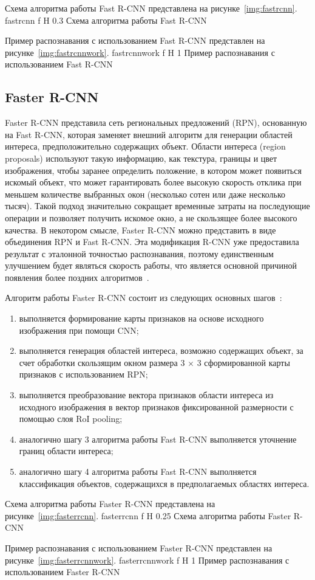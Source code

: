 \clearpage
Схема алгоритма работы Fast R-CNN представлена на рисунке~\ref{img:fastrcnn}.
	{fastrcnn}
	{f}
	{H}
	{0.3\textwidth}
	{Схема алгоритма работы Fast R-CNN}

Пример распознавания с использованием Fast R-CNN представлен на рисунке~\ref{img:fastrcnnwork}.
	{fastrcnnwork}
	{f}
	{H}
	{1\textwidth}
	{Пример распознавания с использованием Fast R-CNN}

\clearpage

\subsection{Faster R-CNN}

Faster R-CNN представила сеть региональных предложений (RPN), основанную на Fast R-CNN, которая заменяет внешний алгоритм для генерации областей интереса, предположительно содержащих объект.
Области интереса (region proposals) используют такую информацию, как текстура, границы и цвет изображения, чтобы заранее определить положение, в котором может появиться искомый объект, что может гарантировать более высокую скорость отклика при меньшем количестве выбранных окон (несколько сотен или даже несколько тысяч).
Такой подход значительно сокращает временные затраты на последующие операции и позволяет получить искомое окно, а не скользящее более высокого качества.
В некотором смысле, Faster R-CNN можно представить в виде объединения RPN и Fast R-CNN.
Эта модификация R-CNN уже предоставила результат с эталонной точностью распознавания, поэтому единственным улучшением будет являться скорость работы, что является основной причиной появления более поздних алгоритмов~\cite{fasterrcnn}.

Алгоритм работы Faster R-CNN состоит из следующих основных шагов~\cite{yolochina, rcnn, fasterrcnn}:
\begin{enumerate}
	\item выполняется формирование карты признаков на основе исходного изображения при помощи CNN;
	\item выполняется генерация областей интереса, возможно содержащих объект, за счет обработки скользящим окном размера 3 $\times$ 3 сформированной карты признаков с использованием RPN;
	\item выполняется преобразование вектора признаков области интереса из исходного изображения в вектор признаков фиксированной размерности с помощью слоя RoI pooling;
	\item аналогично шагу 3 алгоритма работы Fast R-CNN выполняется уточнение границ области интереса;
	\item аналогично шагу 4 алгоритма работы Fast R-CNN выполняется классификация объектов, содержащихся в предполагаемых областях интереса.
\end{enumerate}

\clearpage
Схема алгоритма работы Faster R-CNN представлена на рисунке~\ref{img:fasterrcnn}.
	{fasterrcnn}
	{f}
	{H}
	{0.25\textwidth}
	{Схема алгоритма работы Faster R-CNN}

Пример распознавания с использованием Faster R-CNN представлен на рисунке~\ref{img:fasterrcnnwork}.
	{fasterrcnnwork}
	{f}
	{H}
	{1\textwidth}
	{Пример распознавания с использованием Faster R-CNN}
